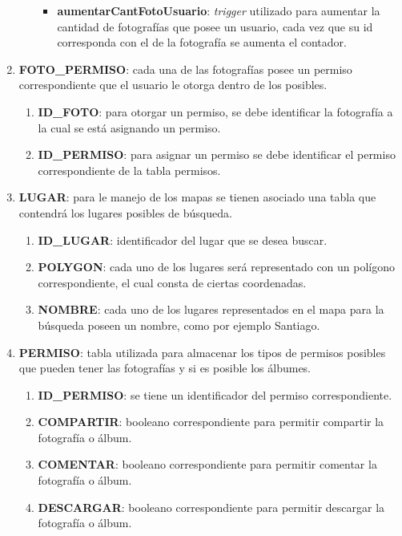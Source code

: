 \documentclass{memoria}
\begin{document}
\begin{enumerate}
\begin{enumerate}
		\begin{itemize}
		\item \textbf{aumentarCantFotoUsuario}: \textsl{trigger} utilizado para aumentar la cantidad de fotografías que posee un usuario, cada vez que su id corresponda con el de la fotografía se aumenta el contador.
		\end{itemize}
	\end{enumerate}

\item \textbf{FOTO\_PERMISO}: cada una de las fotografías posee un permiso correspondiente que el usuario le otorga dentro de los posibles.

	\begin{enumerate}
	\item \textbf{ID\_FOTO}: para otorgar un permiso, se debe identificar la fotografía a la cual se está asignando un permiso.
	\item \textbf{ID\_PERMISO}: para asignar un permiso se debe identificar el permiso correspondiente de la tabla permisos.
	\end{enumerate}

\item \textbf{LUGAR}: para le manejo de los mapas se tienen asociado una tabla que contendrá los lugares posibles de búsqueda.

	\begin{enumerate}
	\item \textbf{ID\_LUGAR}: identificador del lugar que se desea buscar.
	\item \textbf{POLYGON}: cada uno de los lugares será representado con un polígono correspondiente, el cual consta de ciertas coordenadas.
	\item \textbf{NOMBRE}: cada uno de los lugares representados en el mapa para la búsqueda poseen un nombre, como por ejemplo Santiago.
	\end{enumerate}

\item \textbf{PERMISO}: tabla utilizada para almacenar los tipos de permisos posibles que pueden tener las fotografías y si es posible los álbumes.

	\begin{enumerate}
	 \item \textbf{ID\_PERMISO}: se tiene un identificador del permiso correspondiente.
	 \item \textbf{COMPARTIR}: booleano correspondiente para permitir compartir la fotografía o álbum.
	 \item \textbf{COMENTAR}: booleano correspondiente para permitir comentar la fotografía o álbum.
	 \item \textbf{DESCARGAR}: booleano correspondiente para permitir descargar la fotografía o álbum.
	 \end{enumerate}
	 

\end{enumerate}
\end{document}
